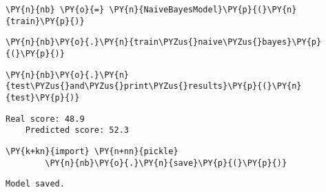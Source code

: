 \begin{tcolorbox}[breakable, size=fbox, boxrule=1pt, pad at break*=1mm,colback=cellbackground, colframe=cellborder]
    \begin{Verbatim}[commandchars=\\\{\}]
        \PY{n}{nb} \PY{o}{=} \PY{n}{NaiveBayesModel}\PY{p}{(}\PY{n}{train}\PY{p}{)}
    \end{Verbatim}
\end{tcolorbox}

\begin{tcolorbox}[breakable, size=fbox, boxrule=1pt, pad at break*=1mm,colback=cellbackground, colframe=cellborder]
    \begin{Verbatim}[commandchars=\\\{\}]
        \PY{n}{nb}\PY{o}{.}\PY{n}{train\PYZus{}naive\PYZus{}bayes}\PY{p}{(}\PY{p}{)}
    \end{Verbatim}
\end{tcolorbox}

\begin{tcolorbox}[breakable, size=fbox, boxrule=1pt, pad at break*=1mm,colback=cellbackground, colframe=cellborder]
    \begin{Verbatim}[commandchars=\\\{\}]
        \PY{n}{nb}\PY{o}{.}\PY{n}{test\PYZus{}and\PYZus{}print\PYZus{}results}\PY{p}{(}\PY{n}{test}\PY{p}{)}
    \end{Verbatim}
\end{tcolorbox}

\begin{Verbatim}[commandchars=\\\{\}]
    Real score: 48.9
    Predicted score: 52.3
\end{Verbatim}

\begin{tcolorbox}[breakable, size=fbox, boxrule=1pt, pad at break*=1mm,colback=cellbackground, colframe=cellborder]
    \begin{Verbatim}[commandchars=\\\{\}]
        \PY{k+kn}{import} \PY{n+nn}{pickle}
        \PY{n}{nb}\PY{o}{.}\PY{n}{save}\PY{p}{(}\PY{p}{)}
    \end{Verbatim}
\end{tcolorbox}

\begin{Verbatim}[commandchars=\\\{\}]
    Model saved.
\end{Verbatim}

